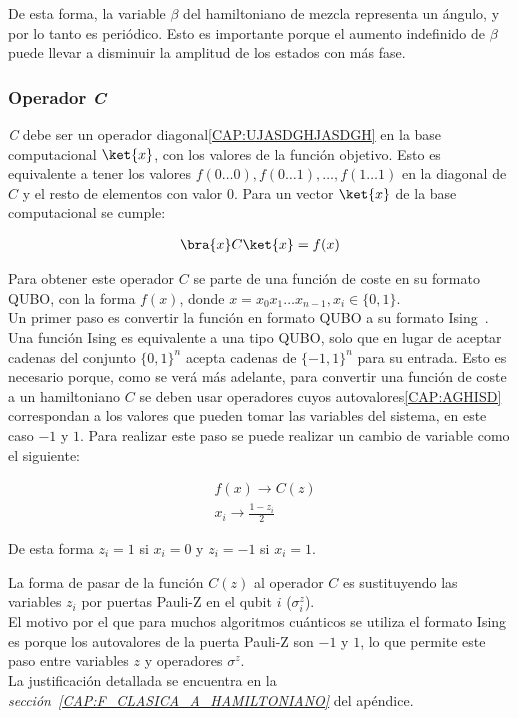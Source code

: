 De esta forma, la variable $\beta$ del hamiltoniano de mezcla representa un ángulo, y por lo tanto es periódico.
Esto es importante porque el aumento indefinido de $\beta$ puede llevar a disminuir la amplitud de los estados con más fase.


\subsubsection{Operador \textit{C}\label{sec:3-operador_c}}

\textit{C} debe ser un operador diagonal\ref{CAP:UJASDGHJASDGH} en la base computacional $\ket{x}$, con los valores de la función objetivo.
Esto es equivalente a tener los valores $f(0 \ldots 0), f(0 \ldots 1), \ldots, f(1 \ldots 1)$ en la diagonal de $C$ y el resto de elementos con valor 0.
Para un vector $\ket{x}$ de la base computacional se cumple:

\begin{align}
  \bra{x}C\ket{x} = f(x)
\end{align}

Para obtener este operador $C$ se parte de una función de coste en su formato QUBO, con la forma $f(x)$, donde $x=x_0x_1 \ldots x_{n-1}, x_i \in \{0, 1\}$.
\\
Un primer paso es convertir la función en formato QUBO a su formato Ising~\cite{ising_formulations_of_np_problems}.
Una función Ising es equivalente a una tipo QUBO, solo que en lugar de aceptar cadenas del conjunto ${\{0, 1\}}^n$ acepta cadenas de ${\{-1, 1\}}^n$ para su entrada.
Esto es necesario porque, como se verá más adelante, para convertir una función de coste a un hamiltoniano $C$ se deben usar operadores cuyos autovalores\ref{CAP:AGHISD} correspondan a los valores que pueden tomar las variables del sistema, en este caso $-1$ y $1$.
Para realizar este paso se puede realizar un cambio de variable como el siguiente:

\begin{align}
  &f(x) \rightarrow C(z) \\
  &x_i \rightarrow \frac{1 - z_i}{2} \nonumber
\end{align}

De esta forma $z_i = 1$ si $x_i = 0$ y $z_i = -1$ si $x_i = 1$.

La forma de pasar de la función $C(z)$ al operador $C$ es sustituyendo las variables $z_i$ por puertas Pauli-Z en el qubit $i$ ($\sigma^z_i$).
\\
El motivo por el que para muchos algoritmos cuánticos se utiliza el formato Ising es porque los autovalores de la puerta Pauli-Z son $-1$ y $1$, lo que permite este paso entre variables $z$ y operadores $\sigma^z$.
\\
La justificación detallada se encuentra en la \textit{sección~\ref{CAP:F_CLASICA_A_HAMILTONIANO}} del apéndice.

